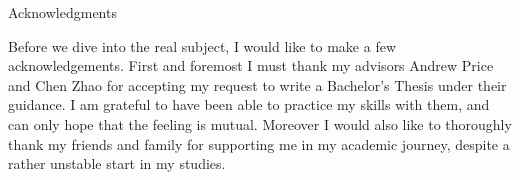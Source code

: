 \thispagestyle{empty}

\vspace*{20mm}

\begin{center}
    { Acknowledgments}
\end{center}



\noindent Before we dive into the real subject, I would like to make a few acknowledgements. First and foremost I must thank my advisors Andrew Price and Chen Zhao for accepting my request to write a Bachelor’s Thesis under their guidance. I am grateful to have been able to practice my skills with them, and can only hope that the feeling is mutual. Moreover I would also like to thoroughly thank my friends and family for supporting me in my academic journey, despite a rather unstable start in my studies.

\cleardoublepage{}
